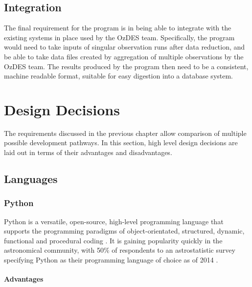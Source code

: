 \documentclass[titlesmallcaps, examinerscopy, copyrightpage]{uqthesis}
\begin{document}
\section{Integration}

The final requirement for the program is in being able to integrate with the existing systems in place used by the OzDES team. Specifically, the program would need to take inputs of singular observation runs after data reduction, and be able to take data files created by aggregation of multiple observations by the OzDES team. The results produced by the program then need to be a consistent, machine readable format, suitable for easy digestion into a database system.



\chapter{Design Decisions}
\label{ch:design}

The requirements discussed in the previous chapter allow comparison of multiple possible development pathways. In this section, high level design decisions are laid out in terms of their advantages and disadvantages. 

\section{Languages}

\subsection{Python}

Python is a versatile, open-source, high-level programming language that supports the programming paradigms of object-orientated, structured, dynamic, functional and procedural coding \cite{Python}. It is gaining popularity quickly in the astronomical community, with 50\% of respondents to an astrostatistic survey specifying Python as their programming language of choice as of 2014 \cite{PythonPop}.

\subsubsection{Advantages}
\end{document}

